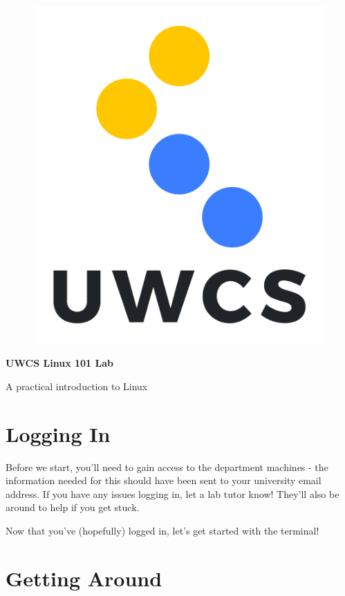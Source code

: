 \documentclass[a4paper,11pt,parskip=half-]{scrartcl}
\begin{document}
\begin{figure}
    \vspace{-10pt} %
    \includegraphics[width=0.9\linewidth]{shield.png}
    \vspace{-100pt} %
\end{figure}

\normalfont \Huge \bfseries UWCS Linux 101 Lab

\normalfont\LARGE A practical introduction to Linux
\normalsize

\section*{Logging In}

Before we start, you'll need to gain access to the department machines - the information needed for this should have been sent to your university email address. 
If you have any issues logging in, let a lab tutor know! 
They'll also be around to help if you get stuck. 

Now that you've (hopefully) logged in, let's get started with the terminal!

\section*{Getting Around}
\end{document}
